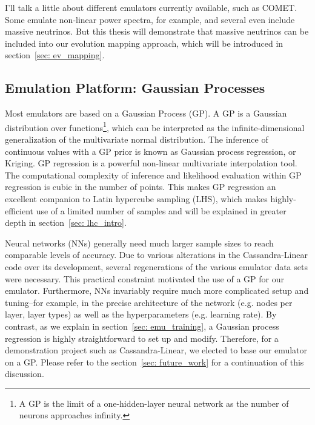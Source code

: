 \documentclass[11pt]{article}
\begin{document}
I'll talk a little about different emulators currently available, such as COMET. Some emulate non-linear power spectra, for example, and several even include massive neutrinos. But this thesis will demonstrate that massive neutrinos can be included into our evolution mapping approach, which will be introduced in section~\ref{sec: ev_mapping}.


\begin{centering}
\subsection{Emulation Platform: Gaussian Processes}
\end{centering}


Most emulators are based on a Gaussian Process (GP). A GP is a Gaussian
distribution over functions\footnote
{A GP is the limit of a one-hidden-layer neural network as the number of
neurons approaches infinity.}, which can be interpreted
as the infinite-dimensional generalization of the multivariate normal
distribution. The inference of continuous values with a GP prior
is known as Gaussian process regression, or Kriging. GP regression is a
powerful non-linear multivariate interpolation tool. The computational
complexity of inference and likelihood evaluation within GP regression is cubic
in the number of points. This makes GP regression an excellent companion to
Latin hypercube sampling (LHS), which makes highly-efficient use of a limited 
number of samples and will be explained in greater depth in section~\ref{sec:
lhc_intro}.

Neural networks (NNs) generally need much larger sample sizes to reach
comparable levels of
accuracy. Due to various alterations in the Cassandra-Linear code over its
development, several regenerations of the various emulator data sets were
necessary. This practical constraint motivated the use of a GP for our
emulator. Furthermore, NNs invariably require much more complicated setup and
tuning--for example, in the precise architecture of the network (e.g. nodes
per layer, layer types) as well as the hyperparameters (e.g. learning rate).
By contrast, as we explain in section~\ref{sec: emu_training}, a Gaussian
process regression is highly straightforward to set up and modify. Therefore,
for a demonstration project such as Cassandra-Linear, we elected to base our
emulator on a GP. Please refer to the section~\ref{sec: future_work} for a
continuation of this discussion.
\end{document}
